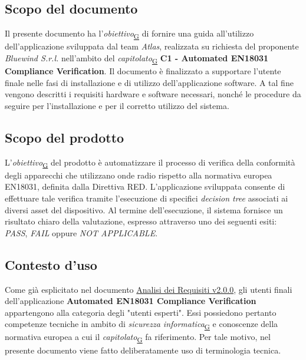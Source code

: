 \documentclass[a4paper,12pt]{article}
\begin{document}
    \subsection{Scopo del documento}
        Il presente documento ha l'\textit{obiettivo}\textsubscript{\href{https://atlasteam9.github.io/Atlas/glossario.html\#Obiettivo}{G}} di fornire una guida all'utilizzo dell'applicazione sviluppata dal team \textit{Atlas}, realizzata su richiesta del proponente \textit{Bluewind S.r.l.} nell'ambito del \textit{capitolato}\textsubscript{\href{https://atlasteam9.github.io/Atlas/glossario.html\#Capitolato}{G}} \textbf{C1 - Automated EN18031 Compliance Verification}. \newline
        Il documento è finalizzato a supportare l'utente finale nelle fasi di installazione e di utilizzo dell'applicazione software. A tal fine vengono descritti i requisiti hardware e software necessari, nonché le procedure da seguire per l'installazione e per il corretto utilizzo del sistema.

    \subsection{Scopo del prodotto}
        L'\textit{obiettivo}\textsubscript{\href{https://atlasteam9.github.io/Atlas/glossario.html\#Obiettivo}{G}} del prodotto è automatizzare il processo di verifica della conformità degli apparecchi che utilizzano onde radio rispetto alla normativa europea EN18031, definita dalla Direttiva RED. \newline
        L'applicazione sviluppata consente di effettuare tale verifica tramite l'esecuzione di specifici \textit{decision tree} associati ai diversi asset del dispositivo. Al termine dell'esecuzione, il sistema fornisce un risultato chiaro della valutazione, espresso attraverso uno dei seguenti esiti: \textit{PASS}, \textit{FAIL} oppure \textit{NOT APPLICABLE}.

    \subsection{Contesto d'uso}
        Come già esplicitato nel documento \href{https://atlasteam9.github.io/Atlas/docs/PB/documenti/esterni/Analisi%20dei%20Requisiti.pdf}{Analisi dei Requisiti v2.0.0}, gli utenti finali dell'applicazione \textbf{Automated EN18031 Compliance Verification} appartengono alla categoria degli "utenti esperti". Essi possiedono pertanto competenze tecniche in ambito di \textit{sicurezza informatica}\textsubscript{\href{https://atlasteam9.github.io/Atlas/glossario.html\#Sicurezzainformatica}{G}} e conoscenze della normativa europea a cui il \textit{capitolato}\textsubscript{\href{https://atlasteam9.github.io/Atlas/glossario.html\#Capitolato}{G}} fa riferimento. \newline
        Per tale motivo, nel presente documento viene fatto deliberatamente uso di terminologia tecnica.
\end{document}
